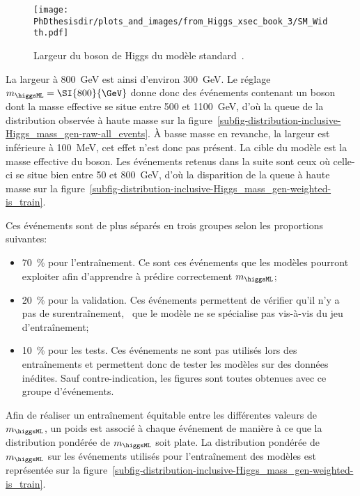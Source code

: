 \begin{figure}[h]
\centering

\vspace{\baselineskip}

\texttt{[image: \\PhDthesisdir/plots\_and\_images/from\_Higgs\_xsec\_book\_3/SM\_Width.pdf]}
\caption[Largeur du boson de Higgs du modèle standard.]{Largeur du boson de Higgs du modèle standard~\cite{Higgs_xsec_book_3}.}
\label{fig-_Higgs_xsec_book_3-SM_Width}
\end{figure}
La largeur à \SI{800}{\GeV} est ainsi d'environ \SI{300}{\GeV}.
Le réglage $m_{\higgsML} = \SI{800}{\GeV}$ donne donc des événements contenant un boson dont la masse effective se situe entre \num{500} et \SI{1100}{\GeV}, d'où la queue de la distribution observée à haute masse sur la figure~\ref{subfig-distribution-inclusive-Higgs_mass_gen-raw-all_events}.
À basse masse en revanche, la largeur est inférieure à \SI{100}{\MeV}, cet effet n'est donc pas présent.
La cible du modèle est la masse effective du boson.
Les événements retenus dans la suite sont ceux où celle-ci se situe bien entre \num{50} et \SI{800}{\GeV},
d'où la disparition de la queue à haute masse sur la figure~\ref{subfig-distribution-inclusive-Higgs_mass_gen-weighted-is_train}.
\par
Ces événements sont de plus séparés en trois groupes selon les proportions suivantes:
\begin{itemize}
\item \SI{70}{\%} pour l'entraînement. Ce sont ces événements que les modèles pourront exploiter afin d'apprendre à prédire correctement $m_{\higgsML}$;
\item \SI{20}{\%} pour la validation. Ces événements permettent de vérifier qu'il n'y a pas de surentraînement, \ie\ que le modèle ne se spécialise pas vis-à-vis du jeu d'entraînement;
\item \SI{10}{\%} pour les tests. Ces événements ne sont pas utilisés lors des entraînements et permettent donc de tester les modèles sur des données inédites. Sauf contre-indication, les figures sont toutes obtenues avec ce groupe d'événements.
\end{itemize}
\par
Afin de réaliser un entraînement équitable entre les différentes valeurs de $m_{\higgsML}$, un poids est associé à chaque événement de manière à ce que la distribution pondérée de $m_{\higgsML}$ soit plate.
La distribution pondérée de $m_{\higgsML}$ sur les événements utilisés pour l'entraînement des modèles est représentée sur la figure~\ref{subfig-distribution-inclusive-Higgs_mass_gen-weighted-is_train}.

